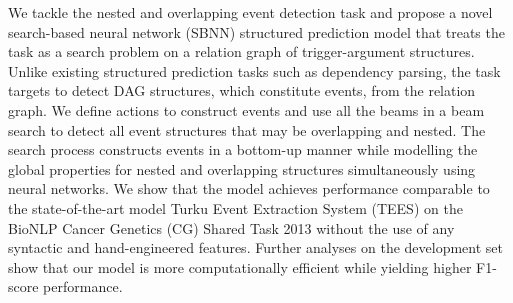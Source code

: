 We tackle the nested and overlapping event detection task and propose a novel search-based neural network (SBNN) structured prediction model that treats the task as a search problem on a relation graph of trigger-argument structures. 
Unlike existing structured prediction tasks such as dependency parsing, the task targets to detect DAG structures, which constitute events, from the relation graph.
We define actions to construct events and use all the beams in a beam search to detect all event structures that may be overlapping and nested.
The search process constructs events in a bottom-up manner while modelling the global properties for nested and overlapping structures simultaneously using neural networks. We show that the model achieves performance comparable to the state-of-the-art model Turku Event Extraction System (TEES) on the BioNLP Cancer Genetics (CG) Shared Task 2013 without the use of any syntactic and hand-engineered features. Further analyses on the development set show that our model is more computationally efficient while yielding higher F1-score performance.
